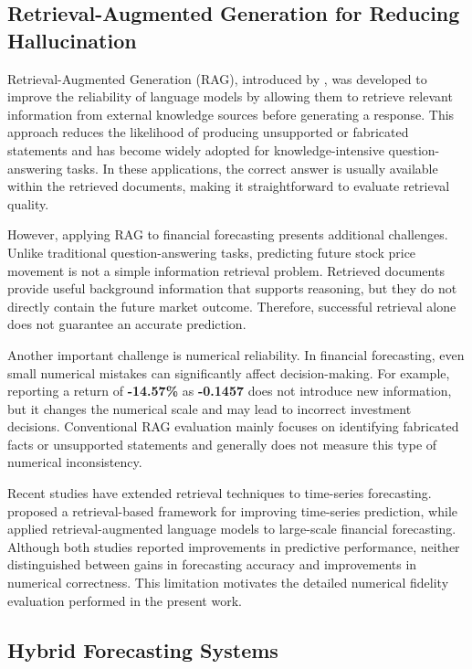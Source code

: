 \subsection{Retrieval-Augmented Generation for Reducing Hallucination}\label{sec:rag-hallucination}

Retrieval-Augmented Generation (RAG), introduced by \citet{lewis2020},
was developed to improve the reliability of language models by allowing
them to retrieve relevant information from external knowledge sources
before generating a response. This approach reduces the likelihood of
producing unsupported or fabricated statements and has become widely
adopted for knowledge-intensive question-answering tasks. In these
applications, the correct answer is usually available within the
retrieved documents, making it straightforward to evaluate retrieval
quality.

However, applying RAG to financial forecasting presents additional
challenges. Unlike traditional question-answering tasks, predicting
future stock price movement is not a simple information retrieval
problem. Retrieved documents provide useful background information that
supports reasoning, but they do not directly contain the future market
outcome. Therefore, successful retrieval alone does not guarantee an
accurate prediction.

Another important challenge is numerical reliability. In financial
forecasting, even small numerical mistakes can significantly affect
decision-making. For example, reporting a return of \textbf{-14.57\%} as
\textbf{-0.1457} does not introduce new information, but it changes the
numerical scale and may lead to incorrect investment decisions.
Conventional RAG evaluation mainly focuses on identifying fabricated
facts or unsupported statements and generally does not measure this type
of numerical inconsistency.

Recent studies have extended retrieval techniques to time-series
forecasting. \citet{wang2024} proposed a retrieval-based framework for
improving time-series prediction, while \citet{chen2025} applied
retrieval-augmented language models to large-scale financial
forecasting. Although both studies reported improvements in predictive
performance, neither distinguished between gains in forecasting accuracy
and improvements in numerical correctness. This limitation motivates the
detailed numerical fidelity evaluation performed in the present work.

\subsection{Hybrid Forecasting Systems}\label{sec:hybrid-forecasting}

